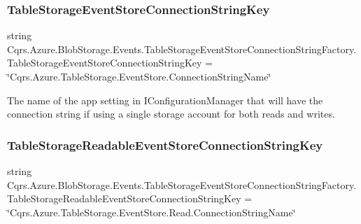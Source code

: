 \subsubsection{\texorpdfstring{Table\+Storage\+Event\+Store\+Connection\+String\+Key}{TableStorageEventStoreConnectionStringKey}}
{\footnotesize\ttfamily string Cqrs.\+Azure.\+Blob\+Storage.\+Events.\+Table\+Storage\+Event\+Store\+Connection\+String\+Factory.\+Table\+Storage\+Event\+Store\+Connection\+String\+Key = \char`\"{}Cqrs.\+Azure.\+Table\+Storage.\+Event\+Store.\+Connection\+String\+Name\char`\"{}\hspace{0.3cm}{\ttfamily [static]}}



The name of the app setting in I\+Configuration\+Manager that will have the connection string if using a single storage account for both reads and writes. 

\mbox{\label{classCqrs_1_1Azure_1_1BlobStorage_1_1Events_1_1TableStorageEventStoreConnectionStringFactory_ac28aea2439fe0bed85d1b53c0fd8fdaf_ac28aea2439fe0bed85d1b53c0fd8fdaf}} 
\subsubsection{\texorpdfstring{Table\+Storage\+Readable\+Event\+Store\+Connection\+String\+Key}{TableStorageReadableEventStoreConnectionStringKey}}
{\footnotesize\ttfamily string Cqrs.\+Azure.\+Blob\+Storage.\+Events.\+Table\+Storage\+Event\+Store\+Connection\+String\+Factory.\+Table\+Storage\+Readable\+Event\+Store\+Connection\+String\+Key = \char`\"{}Cqrs.\+Azure.\+Table\+Storage.\+Event\+Store.\+Read.\+Connection\+String\+Name\char`\"{}\hspace{0.3cm}{\ttfamily [static]}}



